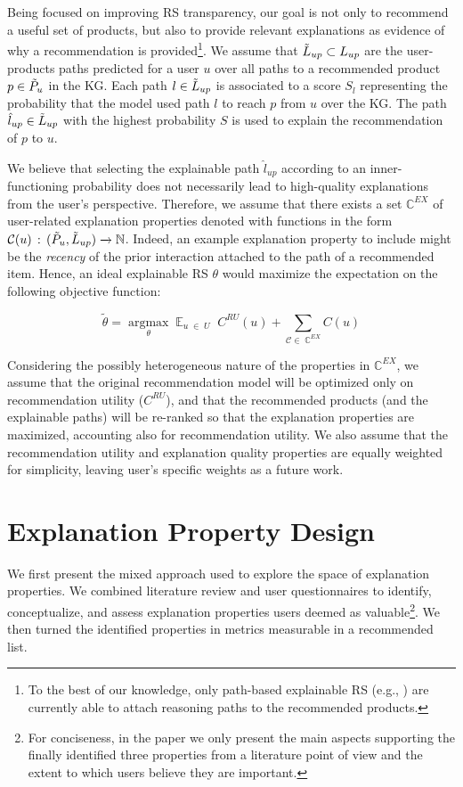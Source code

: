 \documentclass[sigconf]{acmart}
\begin{document}
Being focused on improving RS transparency, our goal is not only to recommend a useful set of products, but also to provide relevant explanations as evidence of why a recommendation is provided\footnote{To the best of our knowledge, only path-based explainable RS (e.g., \cite{XianFMMZ19}) are currently able to attach reasoning paths to the recommended products.}.
We assume that $\Tilde{L}_{up} \subset L_{up}$ are the user-products paths predicted for a user $u$ over all paths to a recommended product $p \in \Tilde{P}_u$ in the KG.  
Each path $l \in \Tilde{L}_{up}$ is associated to a score $S_l$ representing the probability that the model used path $l$ to reach $p$ from $u$ over the KG. 
The path $\hat{l}_{up} \in \Tilde{L}_{up}$ with the highest probability $S$ is used to explain the recommendation of $p$ to $u$.

We believe that selecting the explainable path $\hat{l}_{up}$ according to an inner-functioning probability does not necessarily lead to high-quality explanations from the user's perspective.
Therefore, we assume that there exists a set $\mathbb C^{EX}$ of user-related explanation properties denoted with functions in the form $\mathcal C(u) \, : \, (\Tilde{P}_u, \Tilde{L}_{up}) \xrightarrow{} \mathbb N$.
Indeed, an example explanation property to include might be the \emph{recency} of the prior interaction attached to the path of a recommended item. 
Hence, an ideal explainable RS $\theta$ would maximize the expectation on the following objective function:

\vspace{-2mm}
\begin{equation}
\tilde{\theta} = \underset{\theta}{\operatorname{argmax}} \mathop{\mathbb{E}}_{u \; \in \; U} \; C^{RU}(u) + \sum_{\mathcal C \in \; \mathbb C^{EX}} C(u)
\label{eq:problem-definition}
\end{equation}

Considering the possibly heterogeneous nature of the properties in $\mathbb C^{EX}$, we assume that the original recommendation model will be optimized only on recommendation utility ($C^{RU}$), and that the recommended products (and the explainable paths) will be re-ranked so that the explanation properties are maximized, accounting also for recommendation utility. We also assume that the recommendation utility and explanation quality properties are equally weighted for simplicity, leaving user's specific weights as a future work.   


\section{Explanation Property Design}\label{sec:exp-properties}
We first present the mixed approach used to explore the space of explanation properties. We combined literature review and user questionnaires to identify, conceptualize, and assess explanation properties users deemed as valuable\footnote{For conciseness, in the paper we only present the main aspects supporting the finally identified three properties from a literature point of view and the extent to which users believe they are important.}. We then turned the identified properties in metrics measurable in a recommended list.  
\end{document}
